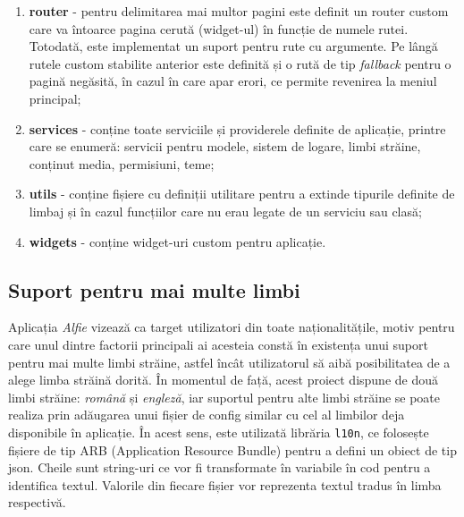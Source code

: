 \begin{enumerate}
        \begin{code}
            \inputminted[frame=single,framesep=2mm,linenos,breaklines,tabsize=2]{dart}{code/dart-migrations.dart}
            \label{code:dart_migrations}
        \end{code}
    \item \textbf{router} - pentru delimitarea mai multor pagini este definit un router custom care va întoarce pagina cerută (widget-ul) în funcție de numele rutei. Totodată, este implementat un suport pentru rute cu argumente. Pe lângă rutele custom stabilite anterior este definită și o rută de tip \textit{fallback} pentru o pagină negăsită, în cazul în care apar erori, ce permite revenirea la meniul principal;
    \item \textbf{services} - conține toate serviciile și providerele definite de aplicație, printre care se enumeră: servicii pentru modele, sistem de logare, limbi străine, conținut media, permisiuni, teme;
    \item \textbf{utils} - conține fișiere cu definiții utilitare pentru a extinde tipurile definite de limbaj și în cazul funcțiilor care nu erau legate de un serviciu sau clasă;
    \item \textbf{widgets} - conține widget-uri custom pentru aplicație.
\end{enumerate}

\subsection{Suport pentru mai multe limbi}

Aplicația \textit{Alfie} vizează ca target utilizatori din toate naționalitățile, motiv pentru care unul dintre factorii principali ai acesteia constă în existența unui suport pentru mai multe limbi străine, astfel încât utilizatorul să aibă posibilitatea de a alege limba străină dorită. În momentul de față, acest proiect dispune de două limbi străine: \textit{română} și \textit{engleză}, iar suportul pentru alte limbi străine se poate realiza prin adăugarea unui fișier de config similar cu cel al limbilor deja disponibile în aplicație. În acest sens, este utilizată librăria \texttt{l10n}, ce folosește fișiere de tip ARB (Application Resource Bundle) pentru a defini un obiect de tip json. Cheile sunt string-uri ce vor fi transformate în variabile în cod pentru a identifica textul. Valorile din fiecare fișier vor reprezenta textul tradus în limba respectivă.

